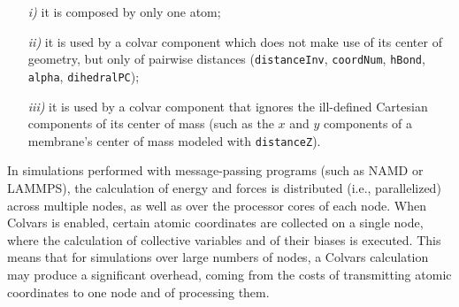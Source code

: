 \begin{enumerate}
  \item[\emph{i)}] it is composed by only one atom;
  \item[\emph{ii)}] it is used by a colvar component which does not make use of its center of geometry, but only of pairwise distances (\texttt{distanceInv}, \texttt{coordNum}, \texttt{hBond}, \texttt{alpha}, \texttt{dihedralPC});
  \item[\emph{iii)}]  it is used by a colvar component that ignores the ill-defined Cartesian components of its center of mass (such as the $x$ and $y$ components of a membrane's center of mass modeled with \texttt{distanceZ}).
\end{enumerate}



In simulations performed with message-passing programs (such as NAMD or LAMMPS), the calculation of energy and forces is distributed (i.e., parallelized) across multiple nodes, as well as over the processor cores of each node.
When Colvars is enabled, certain atomic coordinates are collected on a single node, where the calculation of collective variables and of their biases is executed.
This means that for simulations over large numbers of nodes, a Colvars calculation may produce a significant overhead, coming from the costs of transmitting atomic coordinates to one node and of processing them.

